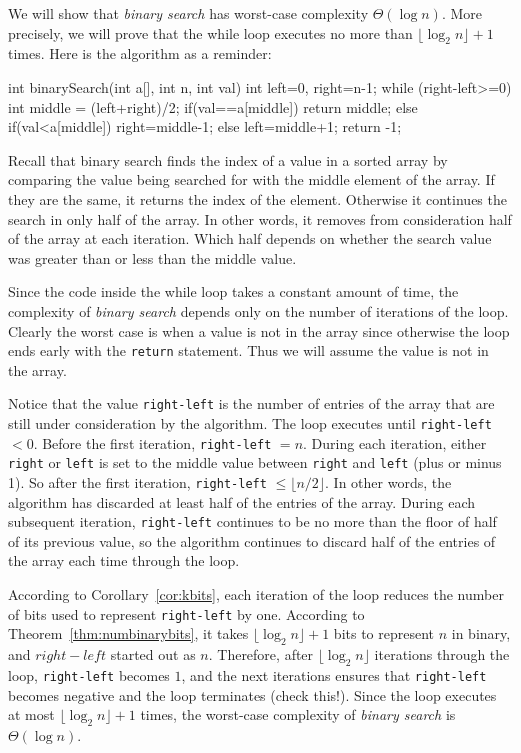 \begin{exa}\label{exa:binSearchIter}
We will show that {\em binary search} has worst-case complexity $\Theta(\log n)$.
More precisely, 
we will prove that the while loop executes no more than $\lfloor \log_2 n\rfloor +1$ times.
Here is the algorithm as a reminder:
\begin{code}
    int binarySearch(int a[], int n, int val) {
       int left=0, right=n-1;
       while (right-left>=0) {
           int middle = (left+right)/2;
           if(val==a[middle]) 
               return middle;
           else if(val<a[middle]) 
               right=middle-1;
           else 
               left=middle+1; 
        }
       return -1;
    }
\end{code}

Recall that binary search finds the index of a value in a sorted array
by comparing the value being searched for with the middle element of the array.
If they are the same, it returns the index of the element.  Otherwise it
continues the search in only half of the array.  In other words, it removes
from consideration half of the array at each iteration.  Which half depends on whether
the search value was greater than or less than the middle value.

Since the code inside the while loop takes a constant amount of time, the
complexity of {\em binary search} depends only on the number of iterations
of the loop.  Clearly the worst case is when a value is not in the array since
otherwise the loop ends early with the \verb+return+ statement.  Thus we will
assume the value is not in the array.

Notice that the value \verb+right-left+ is the number of entries of the array
that are still under consideration by the algorithm.
The loop executes until \verb+right-left+ $<0$.
Before the first iteration, \verb+right-left+ $=n$.
During each iteration,  
either \verb+right+ or \verb+left+ is set to the
middle value between \verb+right+ and \verb+left+ (plus or minus 1).
So after the first iteration, \verb+right-left+ $\leq \lfloor n/2\rfloor$.
In other words, the algorithm has discarded at least half of the entries of
the array.
During each subsequent iteration, \verb+right-left+ continues to be no more than the floor
of half of its previous value, so the algorithm continues to discard half of the entries
of the array each time through the loop.

According to Corollary~\ref{cor:kbits}, each iteration of the loop reduces 
the number of bits used to represent \verb+right-left+ by one.
According to Theorem~\ref{thm:numbinarybits}, 
it takes $\lfloor \log_2 n\rfloor +1$ bits to represent $n$ in binary, and
$right-left$ started out as $n$.
Therefore, after $\lfloor \log_2 n\rfloor$ iterations through the loop, \verb+right-left+
becomes $1$, and the next iterations ensures that \verb+right-left+ becomes
negative and the loop terminates (check this!).  
Since the loop executes at most $\lfloor \log_2 n\rfloor +1$  times,
the worst-case complexity of {\em binary search} is $\Theta(\log n)$.
\end{exa}




